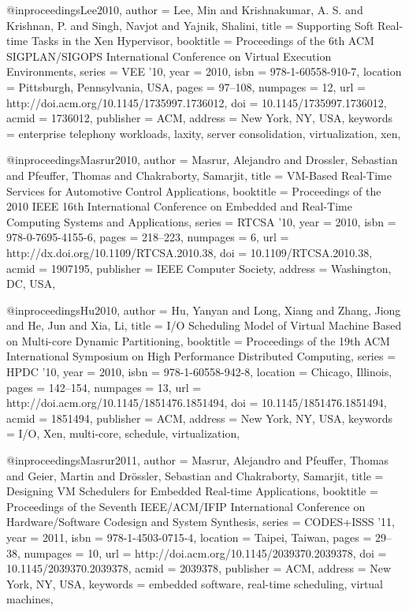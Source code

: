 @inproceedings{Lee2010,
 author = {Lee, Min and Krishnakumar, A. S. and Krishnan, P. and Singh, Navjot and Yajnik, Shalini},
 title = {Supporting Soft Real-time Tasks in the Xen Hypervisor},
 booktitle = {Proceedings of the 6th ACM SIGPLAN/SIGOPS International Conference on Virtual Execution Environments},
 series = {VEE '10},
 year = {2010},
 isbn = {978-1-60558-910-7},
 location = {Pittsburgh, Pennsylvania, USA},
 pages = {97--108},
 numpages = {12},
 url = {http://doi.acm.org/10.1145/1735997.1736012},
 doi = {10.1145/1735997.1736012},
 acmid = {1736012},
 publisher = {ACM},
 address = {New York, NY, USA},
 keywords = {enterprise telephony workloads, laxity, server consolidation, virtualization, xen},
} 

@inproceedings{Masrur2010,
 author = {Masrur, Alejandro and Drossler, Sebastian and Pfeuffer, Thomas and Chakraborty, Samarjit},
 title = {VM-Based Real-Time Services for Automotive Control Applications},
 booktitle = {Proceedings of the 2010 IEEE 16th International Conference on Embedded and Real-Time Computing Systems and Applications},
 series = {RTCSA '10},
 year = {2010},
 isbn = {978-0-7695-4155-6},
 pages = {218--223},
 numpages = {6},
 url = {http://dx.doi.org/10.1109/RTCSA.2010.38},
 doi = {10.1109/RTCSA.2010.38},
 acmid = {1907195},
 publisher = {IEEE Computer Society},
 address = {Washington, DC, USA},
} 

@inproceedings{Hu2010,
 author = {Hu, Yanyan and Long, Xiang and Zhang, Jiong and He, Jun and Xia, Li},
 title = {I/O Scheduling Model of Virtual Machine Based on Multi-core Dynamic Partitioning},
 booktitle = {Proceedings of the 19th ACM International Symposium on High Performance Distributed Computing},
 series = {HPDC '10},
 year = {2010},
 isbn = {978-1-60558-942-8},
 location = {Chicago, Illinois},
 pages = {142--154},
 numpages = {13},
 url = {http://doi.acm.org/10.1145/1851476.1851494},
 doi = {10.1145/1851476.1851494},
 acmid = {1851494},
 publisher = {ACM},
 address = {New York, NY, USA},
 keywords = {I/O, Xen, multi-core, schedule, virtualization},
} 

@inproceedings{Masrur2011,
 author = {Masrur, Alejandro and Pfeuffer, Thomas and Geier, Martin and Dr\"{o}ssler, Sebastian and Chakraborty, Samarjit},
 title = {Designing VM Schedulers for Embedded Real-time Applications},
 booktitle = {Proceedings of the Seventh IEEE/ACM/IFIP International Conference on Hardware/Software Codesign and System Synthesis},
 series = {CODES+ISSS '11},
 year = {2011},
 isbn = {978-1-4503-0715-4},
 location = {Taipei, Taiwan},
 pages = {29--38},
 numpages = {10},
 url = {http://doi.acm.org/10.1145/2039370.2039378},
 doi = {10.1145/2039370.2039378},
 acmid = {2039378},
 publisher = {ACM},
 address = {New York, NY, USA},
 keywords = {embedded software, real-time scheduling, virtual machines},
} 

